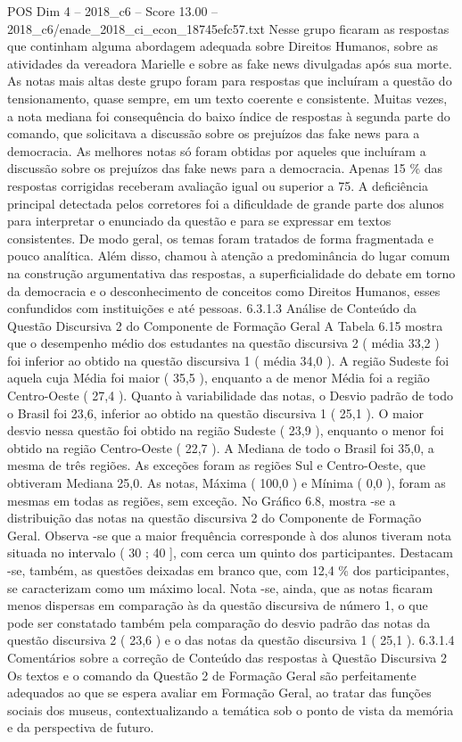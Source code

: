 \begin{textsample}{POS Dim 4 – 2018\_c6 – Score 13.00 – 2018\_c6/enade\_2018\_ci\_econ\_18745efc57.txt}
Nesse grupo ficaram as respostas que continham alguma abordagem adequada sobre Direitos Humanos, sobre as atividades da vereadora Marielle e sobre as fake news divulgadas após sua morte.
As notas mais altas deste grupo foram para respostas que incluíram a questão do tensionamento, quase sempre, em um texto coerente e consistente.
Muitas vezes, a nota mediana foi consequência do baixo índice de respostas à segunda parte do comando, que solicitava a discussão sobre os prejuízos das fake news para a democracia.
As melhores notas só foram obtidas por aqueles que incluíram a discussão sobre os prejuízos das fake news para a democracia.
Apenas 15 \% das respostas corrigidas receberam avaliação igual ou superior a 75.
A deficiência principal detectada pelos corretores foi a dificuldade de grande parte dos alunos para interpretar o enunciado da questão e para se expressar em textos consistentes.
De modo geral, os temas foram tratados de forma fragmentada e pouco analítica.
Além disso, chamou à atenção a predominância do lugar comum na construção argumentativa das respostas, a superficialidade do debate em torno da democracia e o desconhecimento de conceitos como Direitos Humanos, esses confundidos com instituições e até pessoas. 6.3.1.3 Análise de Conteúdo da Questão Discursiva 2 do Componente de Formação Geral A Tabela 6.15 mostra que o desempenho médio dos estudantes na questão discursiva 2 ( média 33,2 ) foi inferior ao obtido na questão discursiva 1 ( média 34,0 ).
A região Sudeste foi aquela cuja Média foi maior ( 35,5 ), enquanto a de menor Média foi a região Centro-Oeste ( 27,4 ).
Quanto à variabilidade das notas, o Desvio padrão de todo o Brasil foi 23,6, inferior ao obtido na questão discursiva 1 ( 25,1 ).
O maior desvio nessa questão foi obtido na região Sudeste ( 23,9 ), enquanto o menor foi obtido na região Centro-Oeste ( 22,7 ).
A Mediana de todo o Brasil foi 35,0, a mesma de três regiões.
As exceções foram as regiões Sul e Centro-Oeste, que obtiveram Mediana 25,0.
As notas, Máxima ( 100,0 ) e Mínima ( 0,0 ), foram as mesmas em todas as regiões, sem exceção.
No Gráfico 6.8, mostra -se a distribuição das notas na questão discursiva 2 do Componente de Formação Geral.
Observa -se que a maior frequência corresponde à dos alunos tiveram nota situada no intervalo ( 30 ; 40 ], com cerca um quinto dos participantes.
Destacam -se, também, as questões deixadas em branco que, com 12,4 \% dos participantes, se caracterizam como um máximo local.
Nota -se, ainda, que as notas ficaram menos dispersas em comparação às da questão discursiva de número 1, o que pode ser constatado também pela comparação do desvio padrão das notas da questão discursiva 2 ( 23,6 ) e o das notas da questão discursiva 1 ( 25,1 ). 6.3.1.4 Comentários sobre a correção de Conteúdo das respostas à Questão Discursiva 2 Os textos e o comando da Questão 2 de Formação Geral são perfeitamente adequados ao que se espera avaliar em Formação Geral, ao tratar das funções sociais dos museus, contextualizando a temática sob o ponto de vista da memória e da perspectiva de futuro.

\end{textsample}
